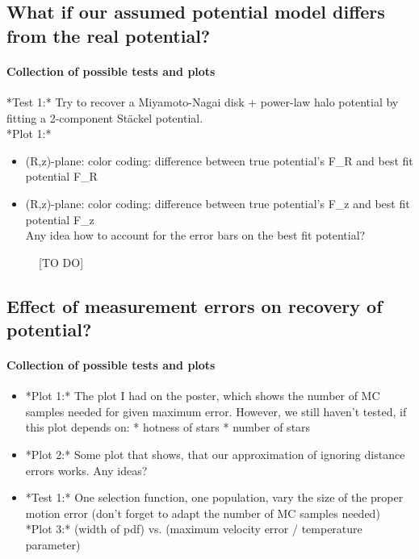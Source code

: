 \documentclass[12pt,preprint]{aastex}
\begin{document}
\subsection{What if our assumed potential model differs from the real potential?}

\paragraph{Collection of possible tests and plots}

*Test 1:* Try to recover a Miyamoto-Nagai disk + power-law halo potential by fitting a 2-component St\"ackel potential. \\
*Plot 1:* 
\begin{itemize}
   \item (R,z)-plane: color coding: difference between true potential's F\_R and best fit potential F\_R
    \item (R,z)-plane: color coding: difference between true potential's F\_z and best fit potential F\_z \\
    Any idea how to account for the error bars on the best fit potential?
\end{itemize}


\begin{figure}
\caption{[TO DO]}
\end{figure}


\subsection{Effect of measurement errors on recovery of potential?}

\paragraph{Collection of possible tests and plots}

\begin{itemize}
\item *Plot 1:* The plot I had on the poster, which shows the number of MC samples needed for given maximum error. However, we still haven't tested, if this plot depends on: 
    * hotness of stars
    * number of stars
\item *Plot 2:* Some plot that shows, that our approximation of ignoring distance errors works. Any ideas?
\item *Test 1:* One selection function, one population, vary the size of the proper motion error (don't forget to adapt the number of MC samples needed) \\
*Plot 3:* (width of pdf) vs. (maximum velocity error / temperature parameter)
\end{itemize}
\end{document}
